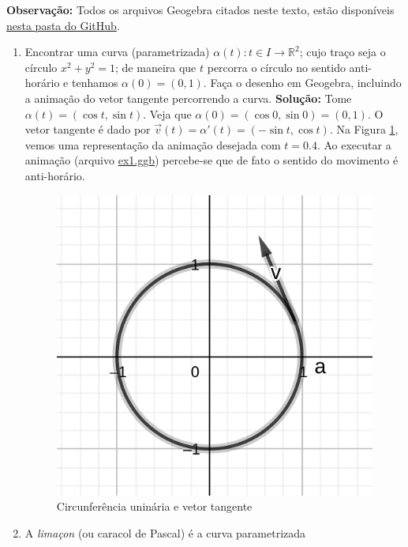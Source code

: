 \documentclass[12pt,letterpaper]{article}
\begin{document}
	
	\large{\textbf{Observação:}} Todos os arquivos Geogebra citados neste texto, estão disponíveis \href{https://github.com/reneroliveira/Curves_and_Surfaces/tree/main/Lists/List1/ggb_files}{nesta pasta do GitHub}.
\begin{enumerate}
	\item Encontrar uma curva (parametrizada) $\alpha(t) : t \in I \to \mathbb{R}^2$; cujo traço seja o círculo
	$x^2 + y^2 = 1$; de maneira que $t$ percorra o círculo no sentido anti-horário e tenhamos $\alpha (0) = (0, 1)$. Faça o desenho em Geogebra, incluindo a animação do vetor tangente percorrendo a curva.
	\subitem \textbf{Solução:} Tome $\alpha (t) = (\cos t,\sin t)$. Veja que $\alpha(0)=(\cos 0,\sin 0) = (0,1)$. O vetor tangente é dado por $\vec v(t)=\alpha '(t)=(-\sin t,\cos t)$. Na Figura \ref{ex1}, vemos uma representação da animação desejada com $t=0.4$. Ao executar a animação (arquivo \href{https://github.com/reneroliveira/Curves_and_Surfaces/tree/main/Lists/List1/ggb_files}{ex1.ggb}) percebe-se que de fato o sentido do movimento é anti-horário.
	\begin{figure}[!htb]
		\centering
		\label{ex1}
		\includegraphics[scale=2]{images/ex1.png}
		\caption{Circunferência uninária e vetor tangente}
	\end{figure}
	
	\item A \emph{limaçon} (ou caracol de Pascal) é a curva parametrizada 
	

\end{enumerate}
\end{document}

